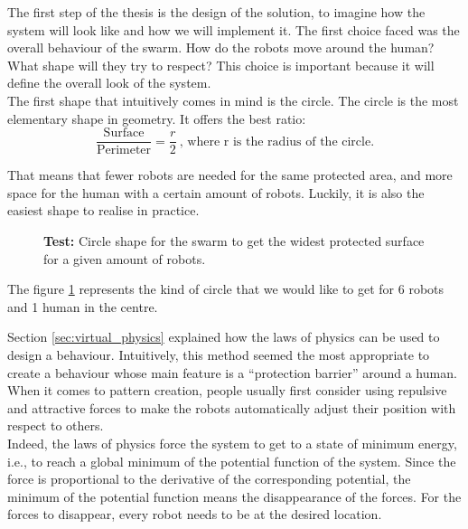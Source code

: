\documentclass[oneside, a4paper, 12pt]{memoir}
\newcommand{\epuck}[3][0] %
{
	\draw [very thick, fill=white] (#2,#3) circle [radius=0.5];
	\draw [very thick, rotate around={#1:(#2,#3)}] (#2-0.25,#3-0.433) -- (#2,#3+0.45) -- (#2+0.25,#3-0.433);
}
\newcommand{\human}[3][0] %
{
	\draw [line width=1.5pt, rotate around={#1:(#2,#3)}] (#2,#3+1) -- (#2-0.866,#3-0.5) -- (#2+0.866,#3-0.5) -- cycle;
	\draw (#2,#3) node[scale=2, rotate around={#1:(#2,#3)}]{H};
}
\let\oldCaption\caption
\renewcommand{\caption}[2]{
\oldCaption[#1]{{\small\sffamily\bfseries #1:} #2}
}
\begin{document}
	
	
	The first step of the thesis is the design of the solution, to imagine how the system will look like and how we will implement it. The first choice faced was the overall behaviour of the swarm. How do the robots move around the human? What shape will they try to respect? This choice is important because it will define the overall look of the system.\\
	
	The first shape that intuitively comes in mind is the circle. The circle is the most elementary shape in geometry. It offers the best ratio:
	$$\frac{\mbox{Surface}}{\mbox{Perimeter}} = \frac{r}{2}~\mbox{, where r is the radius of the circle.}$$
	
	That means that fewer robots are needed for the same protected area, and more space for the human with a certain amount of robots. Luckily, it is also the easiest shape to realise in practice.
	
	\begin{figure}[!h]\centering
	\caption{Test}{Circle shape for the swarm to get the widest protected surface for a given amount of robots.}
	\label{fig:circle_shape}
	\end{figure}
	
		The figure \ref{fig:circle_shape} represents the kind of circle that we would like to get for 6 robots and 1 human in the centre.
		
	
	Section \ref{sec:virtual_physics} explained how the laws of physics can be used to design a behaviour. Intuitively, this method seemed the most appropriate to create a behaviour whose main feature is a \enquote{protection barrier} around a human. When it comes to pattern creation, people usually first consider using repulsive and attractive forces to make the robots automatically adjust their position with respect to others.\\
	
	Indeed, the laws of physics force the system to get to a state of minimum energy, i.e., to reach a global minimum of the potential function of the system. Since the force is proportional to the derivative of the corresponding potential, the minimum of the potential function means the disappearance of the forces. For the forces to disappear, every robot needs to be at the desired location.
	
\end{document}
